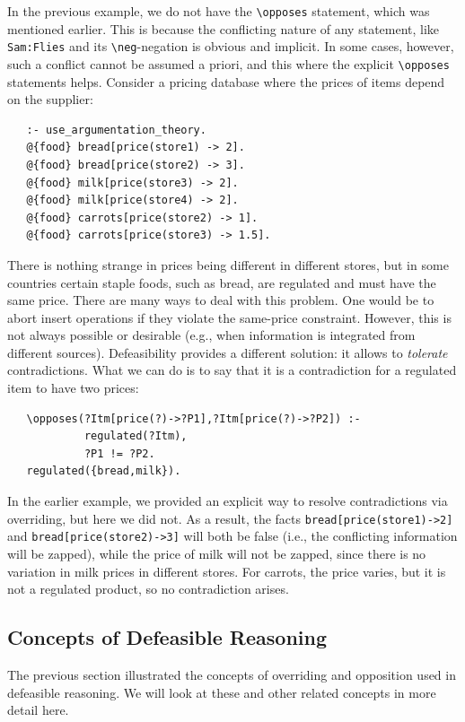 \documentclass[11pt]{article}
\newcommand{\ERGO}{\mbox{\smaller{\ensuremath{\cal{E}}\smaller{{\sc{RGO}}}}}\xspace}
\newcommand{\FLSYSTEM}{\ERGO}
\newcommand{\bs}{\textbackslash}
\newcommand{\RULELOGNEG}{{\texttt{{\bs}neg}}\xspace}
\begin{document}
In the previous example, we do not have the \texttt{\bs{}opposes}
statement, which was mentioned earlier. This is because the conflicting
nature of any statement, like \texttt{Sam:Flies} and its
\texttt{\RULELOGNEG}-negation is obvious and implicit. In some cases, however, such a
conflict cannot be assumed a priori, and this where the explicit
\texttt{\bs{}opposes} statements helps.
Consider a pricing database where the prices of items depend on the supplier:
\begin{verbatim}
   :- use_argumentation_theory.
   @{food} bread[price(store1) -> 2].
   @{food} bread[price(store2) -> 3].
   @{food} milk[price(store3) -> 2].
   @{food} milk[price(store4) -> 2].
   @{food} carrots[price(store2) -> 1].
   @{food} carrots[price(store3) -> 1.5].
\end{verbatim}
There is nothing strange in prices being different in different stores, but
in some countries certain staple foods, such as bread, are regulated and
must have the same price. There are many ways to deal with this problem.
One would be to abort insert operations if they violate the same-price
constraint. However, this is not always possible or desirable (e.g., when
information is integrated from different sources). Defeasibility provides a
different solution: it allows \FLSYSTEM to \emph{tolerate} contradictions.
What we can do is to say that it is a contradiction for
a regulated item to have two prices:
\begin{verbatim}
   \opposes(?Itm[price(?)->?P1],?Itm[price(?)->?P2]) :-
            regulated(?Itm),
            ?P1 != ?P2.
   regulated({bread,milk}).
\end{verbatim}
In the earlier example, we provided an explicit way to resolve contradictions
via overriding, but
here we did not. As a result, the facts \texttt{bread[price(store1)->2]} and
\texttt{bread[price(store2)->3]} will both be false (i.e., the conflicting
information will be zapped), while the price of milk will not be zapped,
since there is no variation in milk prices in different stores. For
carrots, the price varies, but it is not a regulated product, so no
contradiction arises.

\subsection{Concepts of Defeasible Reasoning}

The previous section illustrated the concepts of overriding and opposition
used in defeasible reasoning. We will look at these and other related
concepts in more detail here.
\end{document}
